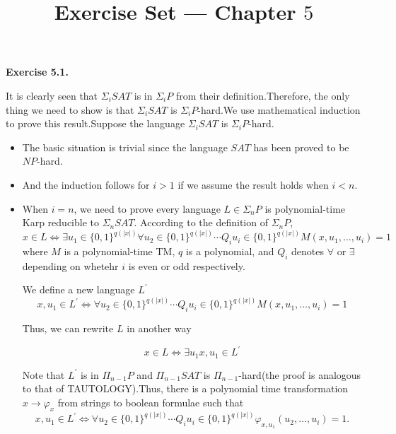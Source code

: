\documentclass[a4paper]{article}
\title{Exercise Set --- Chapter $5$}
\date{}
\newenvironment{exercise}[1]{
	\par
	\noindent\textbf{Exercise #1.}\quad
}{
	\par
	\bigskip
}
\begin{document}
\maketitle

\begin{exercise}{5.1}
    It is clearly seen that $\Sigma_i SAT$ is in $\Sigma_i P$ from their definition.Therefore, the only thing we need to show is that $\Sigma_i SAT$ is $\Sigma_i P$-hard.We use mathematical induction to prove this result.Suppose the language $\Sigma_i SAT$ is $\Sigma_i P$-hard.
    \begin{itemize}
        \item The basic situation is trivial since the language $SAT$ has been proved to be $NP$-hard.
        \item And the induction follows for $i>1$ if we assume the result holds when $i < n$.
        \item When $i=n$, we need to prove every language $L \in \Sigma_n P$ is polynomial-time Karp reducible to $\Sigma_n SAT$. According to the definition of $\Sigma_n P$,
        \begin{equation}
            x \in L \iff \exists u_1\in\{0,1\}^{q(|x|)} \forall u_2 \in \{0,1\}^{q(|x|)}\cdots Q_iu_i\in\{0,1\}^{q(|x|)} M(x,u_1,\dots,u_i)=1
        \end{equation}
        where $M$ is a polynomial-time TM, $q$ is a polynomial, and $Q_i$ denotes $\forall$ or $\exists$ depending on whetehr $i$ is even or odd respectively.
        
        We define a new language $L^{\prime}$
        \begin{equation}
           x,u_1 \in L^{\prime} \iff \forall u_2 \in \{0,1\}^{q(|x|)}\cdots Q_iu_i\in\{0,1\}^{q(|x|)} M(x,u_1,\dots,u_i)=1
        \end{equation}
        
        Thus, we can rewrite $L$ in another way
        
        \begin{equation}
          x\in L \iff \exists u_1 x,u_1 \in L^{\prime}
        \end{equation}
        
        Note that $L^{\prime}$ is in $\Pi_{n-1} P$ and $\Pi_{n-1} SAT $ is $\Pi_{n-1}$-hard(the proof is analogous to that of TAUTOLOGY).Thus, there is a polynomial time transformation $x \rightarrow \varphi_{x}$ from strings to boolean formulae such that
        \begin{equation}
          x,u_1 \in L^{\prime}  \iff \forall u_2 \in \{0,1\}^{q(|x|)}\cdots Q_i u_i\in\{0,1\}^{q(|x|)}\varphi_{x,u_1}(u_2,\dots,u_i)=1. 
        \end{equation}
        

\end{itemize}
\end{exercise}
\end{document}
